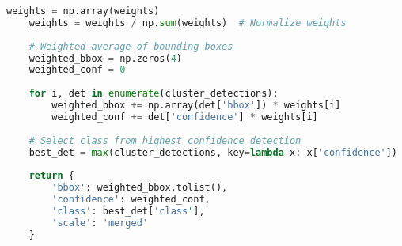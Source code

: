 \documentclass[a4paper,11pt]{article}
\begin{document}
\begin{lstlisting}[language=Python, caption=Advanced Detection Merging Algorithm]
    weights = np.array(weights)
    weights = weights / np.sum(weights)  # Normalize weights
    
    # Weighted average of bounding boxes
    weighted_bbox = np.zeros(4)
    weighted_conf = 0
    
    for i, det in enumerate(cluster_detections):
        weighted_bbox += np.array(det['bbox']) * weights[i]
        weighted_conf += det['confidence'] * weights[i]
    
    # Select class from highest confidence detection
    best_det = max(cluster_detections, key=lambda x: x['confidence'])
    
    return {
        'bbox': weighted_bbox.tolist(),
        'confidence': weighted_conf,
        'class': best_det['class'],
        'scale': 'merged'
    }
\end{lstlisting}
\end{document}
